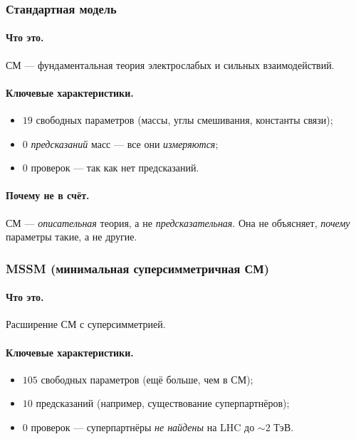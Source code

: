 \documentclass[11pt,a4paper]{article}
\theoremstyle{definition}
\begin{document}
\subsubsection{Стандартная модель}

\paragraph{Что это.} 
СМ — фундаментальная теория электрослабых и сильных 
взаимодействий.

\paragraph{Ключевые характеристики.}
\begin{itemize}
    \item $19$ свободных параметров (массы, углы смешивания, 
          константы связи);
    \item $0$ \emph{предсказаний} масс — все они \emph{измеряются};
    \item $0$ проверок — так как нет предсказаний.
\end{itemize}

\paragraph{Почему не в счёт.}
СМ — \emph{описательная} теория, а не \emph{предсказательная}. 
Она не объясняет, \emph{почему} параметры такие, а не другие.

\subsubsection{MSSM (минимальная суперсимметричная СМ)}

\paragraph{Что это.} 
Расширение СМ с суперсимметрией.

\paragraph{Ключевые характеристики.}
\begin{itemize}
    \item $105$ свободных параметров (ещё больше, чем в СМ);
    \item $10$ предсказаний (например, существование 
          суперпартнёров);
    \item $0$ проверок — суперпартнёры \emph{не найдены} 
          на LHC до $\sim 2$ ТэВ.
\end{itemize}
\end{document}
